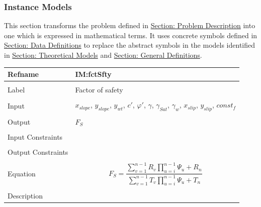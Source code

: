 \documentclass[12pt]{article}
\begin{document}
\subsubsection{Instance Models}
\label{Sec:IMs}
This section transforms the problem defined in \hyperref[Sec:ProbDesc]{Section: Problem Description} into one which is expressed in mathematical terms. It uses concrete symbols defined in \hyperref[Sec:DDs]{Section: Data Definitions} to replace the abstract symbols in the models identified in \hyperref[Sec:TMs]{Section: Theoretical Models} and \hyperref[Sec:GDs]{Section: General Definitions}.
~\newline
 \noindent \begin{minipage}{\textwidth}
\begin{tabular}{p{} p{}}
\toprule \textbf{Refname} & \textbf{IM:fctSfty}
\label{IM:fctSfty}
\\ \midrule \\
Label & Factor of safety
        \\ \midrule \\
        Input & ${x_{slope}}$, ${y_{slope}}$, ${y_{wt}}$, $c'$, $φ'$, $γ$, ${γ_{Sat}}$, ${γ_{w}}$, ${x_{slip}}$, ${y_{slip}}$, $const_f$
                \\ \midrule \\
                Output & ${F_{S}}$
                         \\ \midrule \\
                         Input Constraints & \\ \midrule \\
                                             Output Constraints & \\ \midrule \\
                                                                  Equation & \begin{displaymath}
                                                                             {F_{S}}=\frac{\displaystyle\sum_{v=1}^{n-1}{R_{v} \displaystyle\prod_{u=i}^{n-1}{Ψ_{u}}}+R_{n}}{\displaystyle\sum_{v=1}^{n-1}{T_{v} \displaystyle\prod_{u=i}^{n-1}{Ψ_{u}}}+T_{n}}
                                                                             \end{displaymath}
                                                                             \\ \midrule \\
                                                                             Description & \begin{symbDescription}

\end{symbDescription}
\end{tabular}
\end{minipage}
\end{document}

